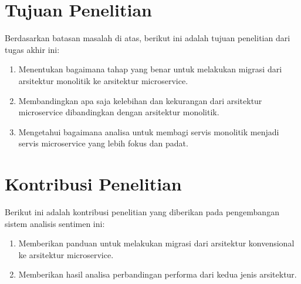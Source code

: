 \section{Tujuan Penelitian}
Berdasarkan batasan masalah di atas, berikut ini adalah tujuan penelitian dari tugas akhir ini:
\begin{enumerate}[nolistsep,leftmargin=0.5cm]
\item Menentukan bagaimana tahap yang benar untuk melakukan migrasi dari arsitektur monolitik ke arsitektur microservice.
\item Membandingkan apa saja kelebihan dan kekurangan dari arsitektur microservice dibandingkan dengan arsitektur monolitik.
\item Mengetahui bagaimana analisa untuk membagi servis monolitik menjadi servis microservice yang lebih fokus dan padat.
\end{enumerate}

\section{Kontribusi Penelitian}
Berikut ini adalah kontribusi penelitian yang diberikan pada pengembangan sistem analisis sentimen ini:
\begin{enumerate}[nolistsep,leftmargin=0.5cm]
\item Memberikan panduan untuk melakukan migrasi dari arsitektur konvensional ke arsitektur microservice.
\item Memberikan hasil analisa perbandingan performa dari kedua jenis arsitektur.
\end{enumerate}


